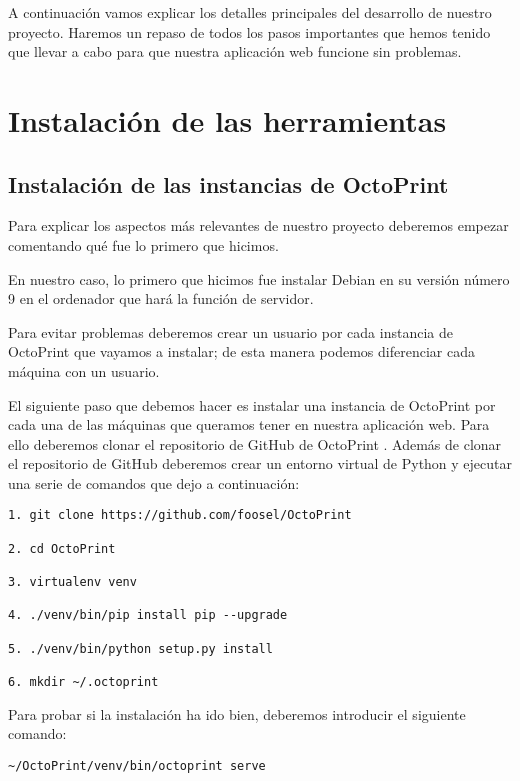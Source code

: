 
A continuación vamos explicar los detalles principales del desarrollo de nuestro proyecto. Haremos un repaso de todos los pasos importantes que hemos tenido que llevar a cabo para que nuestra aplicación web funcione sin problemas.
\section{Instalación de las herramientas}
\subsection{Instalación de las instancias de OctoPrint}

Para explicar los aspectos más relevantes de nuestro proyecto deberemos empezar comentando qué fue lo primero que hicimos.

En nuestro caso, lo primero que hicimos fue instalar Debian en su versión número 9 en el ordenador que hará la función de servidor.

Para evitar problemas deberemos crear un usuario por cada instancia de OctoPrint que vayamos a instalar; de esta manera podemos diferenciar cada máquina con un usuario.

El siguiente paso que debemos hacer es instalar una instancia de OctoPrint por cada una de las máquinas que queramos tener en nuestra aplicación web. Para ello deberemos clonar el repositorio de GitHub de OctoPrint \cite{codigoOctoprint}. Además de clonar el repositorio de GitHub deberemos crear un entorno virtual de Python y ejecutar una serie de comandos que dejo a continuación:

\begin{verbatim}
1. git clone https://github.com/foosel/OctoPrint

2. cd OctoPrint

3. virtualenv venv

4. ./venv/bin/pip install pip --upgrade

5. ./venv/bin/python setup.py install

6. mkdir ~/.octoprint
\end{verbatim}

Para probar si la instalación ha ido bien, deberemos introducir el siguiente comando:

\begin{verbatim}
~/OctoPrint/venv/bin/octoprint serve
\end{verbatim}

